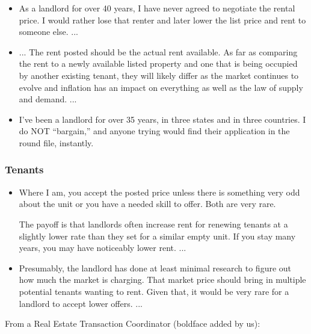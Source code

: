 \begin{itemize} \itshape
	\item As a landlord for over 40 years, I have never agreed to negotiate the rental
	price. I would rather lose that renter and later lower the list price and rent
	to someone else. ...
	
	\item ... The rent posted should be the actual rent available. As far as comparing 
	the rent to a newly available listed property and one that is being occupied 
	by another existing tenant, they will likely differ as the market continues 
	to evolve and inflation has an impact on everything as well as the law of 
	supply and demand. ...
	
	\item I've been a landlord for over 35 years, in three states and in three countries. 
	I do NOT ``bargain,'' and anyone trying would find their application in the round 
	file, instantly.
\end{itemize}
	
\subsubsection*{Tenants}
	
	\begin{itemize} \itshape
		\item Where I am, you accept the posted price unless there is something very 
		odd about the unit or you have a needed skill to offer. 
		Both are very rare.
		
		The payoff is that landlords often increase rent for renewing tenants at 
		a slightly lower rate than they set for a similar empty unit. 
		If you stay many years, you may have noticeably lower rent. ...
		
		\item Presumably, the landlord has done at least minimal research to figure 
		out how much the market is charging. That market price should bring in 
		multiple potential tenants wanting to rent. Given that, it would be very 
		rare for a landlord to accept lower offers. ...
	\end{itemize}
	
From a Real Estate Transaction Coordinator (boldface added by us):
	
